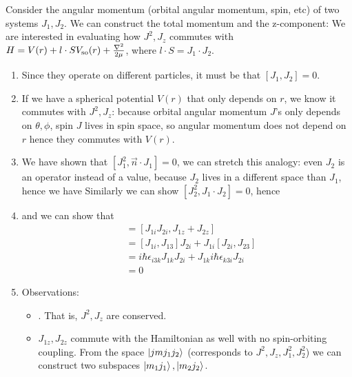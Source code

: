 \documentclass{school-22.101-notes}
\begin{document}
Consider the angular momentum (orbital angular momentum, spin, etc) of two systems $J_1, J_2$. We can construct the total momentum and the z-component: 
We are interested in evaluating how $J^2, J_z$ commutes with $H = V(r) + l \cdot S V_{\mathrm{so}} (r) + \frac{\nabla^2}{2 \mu}$, where $l \cdot S = J_1 \cdot J_2$. 

\begin{enumerate}
\item Since they operate on different particles, it must be that $[J_1, J_2] = 0$. 

\item If we have a spherical potential $V(r)$ that only depends on $r$, we know it commutes with $J^2, J_z$: 
because orbital angular momentum $J$'s only depends on $\theta, \phi$, spin $J$ lives in spin space, so angular momentum does not depend on $r$ hence they commutes with $V(r)$. 

\item We have shown that $[J_1^2, \vec{n} \cdot J_1] = 0$, we can stretch this analogy: even $J_2$ is an operator instead of a value, because $J_2$ lives in a different space than $J_1$, hence we have 
  Similarly we can show $[J_2^2, J_1 \cdot J_2] = 0$, hence 

\item 
  and we can show that
  \begin{align}
    [J_1 \cdot J_2, J_z] &= [J_{1i} J_{2i}, J_{1z} + J_{2z}] \\
    &= [J_{1i}, J_{13}] J_{2i} + J_{1i} [J_{2i}, J_{23}] \\
    &= i \hbar \epsilon_{i3k} J_{1k} J_{2i} + J_{1k} i \hbar \epsilon_{k3i} J_{2i} \\
    &= 0 
  \end{align}

\item Observations: 
  \begin{itemize}
  \item {}. That is, $J^2, J_z$ are conserved. 

  \item $J_{1z}, J_{2z}$ commute with the Hamiltonian as well with no spin-orbiting coupling. From the space $\left| j m j_1 j_2 \right>$ (corresponds to $J^2, J_z, J_1^2, J_2^2$) we can construct two subspaces $\left| m_1 j_1 \right>, \left| m_2 j_2 \right>$. 


\end{itemize}
\end{enumerate}
\end{document}
